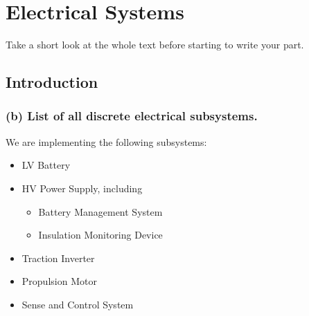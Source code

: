 \chapter{Electrical Systems}
Take a short look at the whole text before starting to write your part.
\section{Introduction}

\subsection{(b) List of all discrete electrical subsystems.}
We are implementing the following subsystems: 
\begin{itemize}
    \item LV Battery
    \item HV Power Supply, including \begin{itemize}
        \item Battery Management System
        \item Insulation Monitoring Device
    \end{itemize}
    \item Traction Inverter
    \item Propulsion Motor    
    \item Sense and Control System
\end{itemize}

